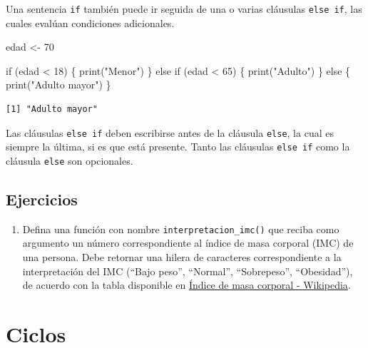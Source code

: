 \documentclass[
  letterpaper,
  DIV=11,
  numbers=noendperiod]{scrreprt}
\newenvironment{Shaded}{\begin{snugshade}}{\end{snugshade}}
\newcommand{\ControlFlowTok}[1]{\textcolor[rgb]{0.00,0.23,0.31}{#1}}
\newcommand{\DecValTok}[1]{\textcolor[rgb]{0.68,0.00,0.00}{#1}}
\newcommand{\FunctionTok}[1]{\textcolor[rgb]{0.28,0.35,0.67}{#1}}
\newcommand{\NormalTok}[1]{\textcolor[rgb]{0.00,0.23,0.31}{#1}}
\newcommand{\OtherTok}[1]{\textcolor[rgb]{0.00,0.23,0.31}{#1}}
\newcommand{\SpecialCharTok}[1]{\textcolor[rgb]{0.37,0.37,0.37}{#1}}
\newcommand{\StringTok}[1]{\textcolor[rgb]{0.13,0.47,0.30}{#1}}
\providecommand{\tightlist}{%
  \setlength{\itemsep}{0pt}\setlength{\parskip}{0pt}}\usepackage{longtable,booktabs,array}
\begin{document}
Una sentencia \texttt{if} también puede ir seguida de una o varias
cláusulas \texttt{else\ if}, las cuales evalúan condiciones adicionales.

\begin{Shaded}
\begin{Highlighting}[]
\NormalTok{edad }\OtherTok{\textless{}{-}} \DecValTok{70}

\ControlFlowTok{if}\NormalTok{ (edad }\SpecialCharTok{\textless{}} \DecValTok{18}\NormalTok{) \{}
  \FunctionTok{print}\NormalTok{(}\StringTok{"Menor"}\NormalTok{)}
\NormalTok{\} }\ControlFlowTok{else} \ControlFlowTok{if}\NormalTok{ (edad }\SpecialCharTok{\textless{}} \DecValTok{65}\NormalTok{) \{}
  \FunctionTok{print}\NormalTok{(}\StringTok{"Adulto"}\NormalTok{)}
\NormalTok{\} }\ControlFlowTok{else}\NormalTok{ \{}
  \FunctionTok{print}\NormalTok{(}\StringTok{"Adulto mayor"}\NormalTok{)}
\NormalTok{\}}
\end{Highlighting}
\end{Shaded}

\begin{verbatim}
[1] "Adulto mayor"
\end{verbatim}

Las cláusulas \texttt{else\ if} deben escribirse antes de la cláusula
\texttt{else}, la cual es siempre la última, si es que está presente.
Tanto las cláusulas \texttt{else\ if} como la cláusula \texttt{else} son
opcionales.

\hypertarget{ejercicios-6}{%
\subsection{Ejercicios}\label{ejercicios-6}}

\begin{enumerate}
\def\labelenumi{\arabic{enumi}.}
\tightlist
\item
  Defina una función con nombre \texttt{interpretacion\_imc()} que
  reciba como argumento un número correspondiente al índice de masa
  corporal (IMC) de una persona. Debe retornar una hilera de caracteres
  correspondiente a la interpretación del IMC (``Bajo peso'',
  ``Normal'', ``Sobrepeso'', ``Obesidad''), de acuerdo con la tabla
  disponible en
  \href{https://es.wikipedia.org/wiki/\%C3\%8Dndice_de_masa_corporal\#Interpretaci\%C3\%B3n}{Índice
  de masa corporal - Wikipedia}.
\end{enumerate}

\hypertarget{ciclos}{%
\section{Ciclos}\label{ciclos}}
\end{document}

